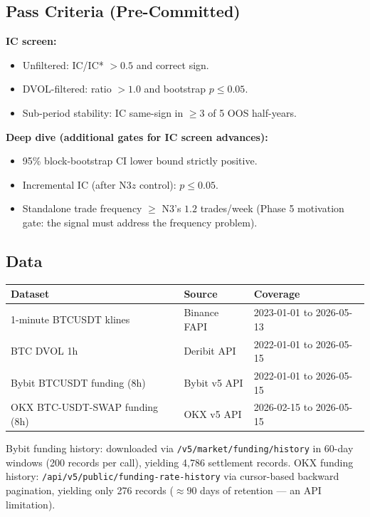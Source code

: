 \documentclass[12pt, a4paper]{article}
\theoremstyle{plain}
\theoremstyle{definition}
\begin{document}
\subsection{Pass Criteria (Pre-Committed)}

\textbf{IC screen:}
\begin{itemize}[noitemsep]
  \item Unfiltered: IC/IC* $> 0.5$ and correct sign.
  \item DVOL-filtered: ratio $> 1.0$ and bootstrap $p \leq 0.05$.
  \item Sub-period stability: IC same-sign in $\geq 3$ of 5 OOS half-years.
\end{itemize}

\textbf{Deep dive (additional gates for IC screen advances):}
\begin{itemize}[noitemsep]
  \item 95\% block-bootstrap CI lower bound strictly positive.
  \item Incremental IC (after N3$z$ control): $p \leq 0.05$.
  \item Standalone trade frequency $\geq$ N3's $1.2$ trades/week (Phase 5
        motivation gate: the signal must address the frequency problem).
\end{itemize}

\subsection{Data}

\begin{center}
\begin{tabular}{lll}
\toprule
Dataset & Source & Coverage \\
\midrule
1-minute BTCUSDT klines & Binance FAPI & 2023-01-01 to 2026-05-13 \\
BTC DVOL 1h & Deribit API & 2022-01-01 to 2026-05-15 \\
Bybit BTCUSDT funding (8h) & Bybit v5 API & 2022-01-01 to 2026-05-15 \\
OKX BTC-USDT-SWAP funding (8h) & OKX v5 API & 2026-02-15 to 2026-05-15 \\
\bottomrule
\end{tabular}
\end{center}

Bybit funding history: downloaded via \texttt{/v5/market/funding/history}
in 60-day windows (200 records per call), yielding 4{,}786 settlement
records.  OKX funding history: \texttt{/api/v5/public/funding-rate-history}
via cursor-based backward pagination, yielding only 276 records
($\approx 90$ days of retention --- an API limitation).
\end{document}
